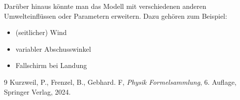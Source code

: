 \documentclass{SimSemBericht} %
\begin{document}
Darüber hinaus könnte man das Modell mit verschiedenen anderen Umwelteinflüssen oder Parametern erweitern.
Dazu gehören zum Beispiel: 
\begin{itemize}
    \item (seitlicher) Wind
    \item variabler Abschusswinkel
    \item Fallschirm bei Landung
\end{itemize}

\begin{thebibliography}{9}
    Kurzweil, P., Frenzel, B., Gebhard. F, \emph{Physik Formelsammlung}, 6. Auflage, Springer Verlag, 2024.
\end{thebibliography}


\end{document}
